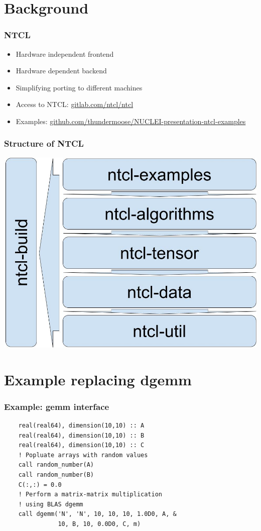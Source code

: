 \section{Background}
\begin{frame}
	\frametitle{NTCL}
	\begin{itemize}
	\item Hardware independent frontend
	\item Hardware dependent backend
	\item Simplifying porting to different machines
	\item Access to NTCL: \url{gitlab.com/ntcl/ntcl}
	\item Examples: \url{github.com/thundermoose/NUCLEI-presentation-ntcl-examples}
	\end{itemize}
\end{frame}
\begin{frame}
\frametitle{Structure of NTCL}
\begin{center}
\includegraphics[scale=0.25]{figures/ntcl-repos.jpg}
\end{center}
\end{frame}
\section{Example replacing dgemm}
\begin{frame}[fragile]
	\frametitle{Example: gemm interface}
	\begin{lstlisting}
    real(real64), dimension(10,10) :: A
    real(real64), dimension(10,10) :: B
    real(real64), dimension(10,10) :: C
    ! Popluate arrays with random values
    call random_number(A)
    call random_number(B)
    C(:,:) = 0.0
    ! Perform a matrix-matrix multiplication 
    ! using BLAS dgemm
    call dgemm('N', 'N', 10, 10, 10, 1.0D0, A, &
               10, B, 10, 0.0D0, C, m)
	\end{lstlisting}
\end{frame}

